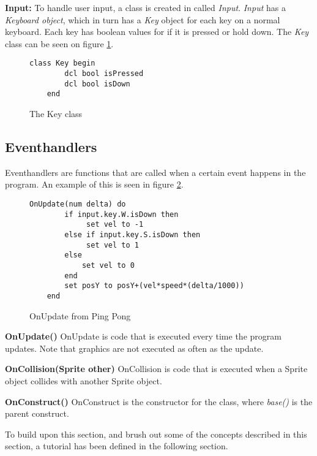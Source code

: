 \textbf{Input:}
To handle user input, a class is created in \lang{} called \textit{Input}. \textit{Input} has a \textit{Keyboard object}, which in turn has a \textit{Key} object for each key on a normal keyboard. Each key has boolean values for if it is pressed or hold down. The \textit{Key} class can be seen on figure \ref{fig:keyclass}.



\begin{figure}[H]
    \centering
    \begin{lstlisting}[style=gglang]
    class Key begin
        dcl bool isPressed
        dcl bool isDown
    end
    \end{lstlisting}
    \caption{The Key class}\label{fig:keyclass}
\end{figure}


\subsection{Eventhandlers}
Eventhandlers are functions that are called when a certain event happens in the program. An example of this is seen in figure \ref{fig:eventhandup}.

\begin{figure}[H]
    \centering
    \begin{lstlisting}[style=gglang]
    OnUpdate(num delta) do
        if input.key.W.isDown then
             set vel to -1
        else if input.key.S.isDown then
             set vel to 1
        else
            set vel to 0
        end
        set posY to posY+(vel*speed*(delta/1000))
    end
    \end{lstlisting}
    \caption{OnUpdate from Ping Pong}\label{fig:eventhandup}
\end{figure}

\textbf{OnUpdate()}
OnUpdate is code that is executed every time the program updates. Note that graphics are not executed as often as the update.

\textbf{OnCollision(Sprite other)}
OnCollision is code that is executed when a Sprite object collides with another Sprite object.

\textbf{OnConstruct()}
OnConstruct is the constructor for the class, where \textit{base()} is the parent construct.



To build upon this section, and brush out some of the concepts described in this section, a tutorial has been defined in the following section.